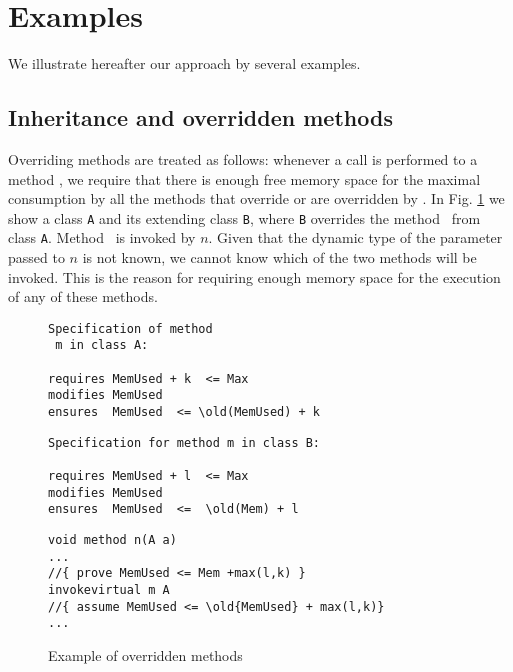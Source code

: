 
\section{Examples}\label{sec:examples}
We illustrate hereafter our approach by several examples. 

\subsection{Inheritance and overridden methods} Overriding methods are treated as follows: whenever a call is performed to a method \method,
we require that there is enough free memory space for the maximal
consumption by all the  methods that override or are overridden by
\method. In Fig. \ref{classExt} we show a class \verb!A! and its
extending class \verb!B!, where \verb!B! overrides the method \method\ from class \verb!A!. Method \method\ is invoked by $n$. Given that the dynamic type of the parameter passed to $n$ is not known, we cannot know which of the two
methods will be invoked. This is the reason for requiring enough memory space for the execution of any of these methods.

\begin{figure}[!htp]
\begin{frameit}
\begin{center}
\begin{minipage}[c]{\linewidth}%
\begin{lstlisting}[frame=trbl]
Specification of method
 m in class A:

requires MemUsed + k  <= Max 
modifies MemUsed 
ensures  MemUsed  <= \old(MemUsed) + k
\end{lstlisting}

\begin{lstlisting}[frame=trbl]
Specification for method m in class B:

requires MemUsed + l  <= Max 
modifies MemUsed 
ensures  MemUsed  <=  \old(Mem) + l
\end{lstlisting}

\end{minipage}

\begin{minipage}[c]{\linewidth} %
\begin{lstlisting}[frame=trbl]
void method n(A a)
...
//{ prove MemUsed <= Mem +max(l,k) }
invokevirtual m A
//{ assume MemUsed <= \old{MemUsed} + max(l,k)}
...
\end{lstlisting}
\end{minipage}

\caption{\sc Example of overridden methods}
\label{classExt}
\end{center}
\end{frameit}
\end{figure}


